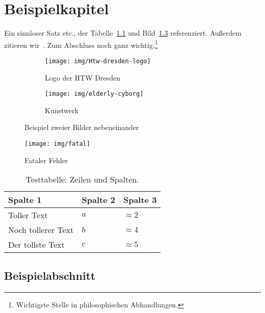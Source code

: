 
\chapter{Beispielkapitel}


Ein sinnloser Satz \gls{etc.}, der Tabelle~\ref{tab:testtable} und Bild~\ref{fig:testfig} referenziert.
Außerdem zitieren wir~\textcite{test16}.
Zum Abschluss noch ganz wichtig.\footnote{Wichtigste Stelle in philosophischen Abhandlungen.}


\begin{figure}[p]
    \centering
    \begin{subfigure}[b]{0.48\linewidth}
        \centering
        \texttt{[image: img/Htw-dresden-logo]}
        \caption{Logo der HTW Dresden}\label{fig:logo-htw}
    \end{subfigure}\enspace%
    \begin{subfigure}[b]{0.48\linewidth}
        \centering
        \texttt{[image: img/elderly-cyborg]}
        \caption{Kunstwerk}\label{fig:kunstwerk}
    \end{subfigure}
    \caption{Beispiel zweier Bilder nebeneinander}\label{fig:testfig}
\end{figure}

\begin{figure}[p]
    \centering
    \texttt{[image: img/fatal]}
    \caption{Fataler Fehler}\label{fig:fatal}
\end{figure}

\begin{table}
    \centering
    \caption[Testtable]%
        {Testtabelle: Zeilen und Spalten.}
    \begin{tabular}{lll}
        \toprule
        Spalte 1 & Spalte 2 & Spalte 3 \\
        \midrule
        Toller Text  & $a$ & $\approx 2$ \\
        Noch tollerer Text & $b$ & $\approx 4$ \\
        Der tollste Text & $c$ & $\approx 5$ \\
        \bottomrule
    \end{tabular}\label{tab:testtable}
\end{table}

\section{Beispielabschnitt}

